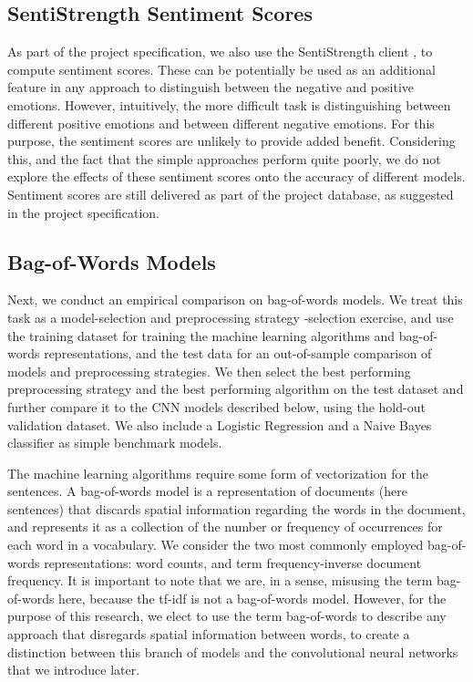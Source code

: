 \documentclass[conference]{IEEEtran}
\begin{document}
\subsection{SentiStrength Sentiment Scores}
As part of the project specification, we also use the SentiStrength client \cite{sentistrength}, to compute sentiment scores. These can be potentially be used as an additional feature in any approach to distinguish between the negative and positive emotions. However, intuitively, the more difficult task is distinguishing between different positive emotions and between different negative emotions. For this purpose, the sentiment scores are unlikely to provide added benefit. Considering this, and the fact that the simple approaches perform quite poorly, we do not explore the effects of these sentiment scores onto the accuracy of different models. Sentiment scores are still delivered as part of the project database, as suggested in the project specification.

\subsection{Bag-of-Words Models}

Next, we conduct an empirical comparison on bag-of-words models. We treat this task as a model-selection and preprocessing strategy -selection exercise, and use the training dataset for training the machine learning algorithms and bag-of-words representations, and the test data for an out-of-sample comparison of models and preprocessing strategies. We then select the best performing preprocessing strategy and the best performing algorithm on the test dataset and further compare it to the CNN models described below, using the hold-out validation dataset. We also include a Logistic Regression and a Naive Bayes classifier as simple benchmark models.

The machine learning algorithms require some form of vectorization for the sentences. A bag-of-words model is a representation of documents (here sentences) that discards spatial information regarding the words in the document, and represents it as a collection of the number or frequency of occurrences for each word in a vocabulary. We consider the two most commonly employed bag-of-words representations: word counts\cite{luhn}, and term frequency-inverse document frequency\cite{tfidf}. It is important to note that we are, in a sense, misusing the term bag-of-words here, because the tf-idf is not a bag-of-words model. However, for the purpose of this research, we elect to use the term bag-of-words to describe any approach that disregards spatial information between words, to create a distinction between this branch of models and the convolutional neural networks that we introduce later.
\end{document}
